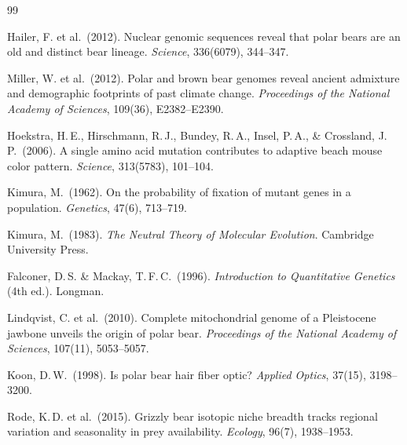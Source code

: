 ﻿\documentclass[12pt,a4paper]{article}
\theoremstyle{remark}
\begin{document}
\begin{thebibliography}{99}

Hailer, F. et al.\ (2012).
Nuclear genomic sequences reveal that polar bears are an old and distinct bear lineage.
\textit{Science}, 336(6079), 344--347.

Miller, W. et al.\ (2012).
Polar and brown bear genomes reveal ancient admixture and demographic footprints of past climate change.
\textit{Proceedings of the National Academy of Sciences}, 109(36), E2382--E2390.

Hoekstra, H.\,E., Hirschmann, R.\,J., Bundey, R.\,A., Insel, P.\,A., \& Crossland, J.\,P.\ (2006).
A single amino acid mutation contributes to adaptive beach mouse color pattern.
\textit{Science}, 313(5783), 101--104.

Kimura, M.\ (1962).
On the probability of fixation of mutant genes in a population.
\textit{Genetics}, 47(6), 713--719.

Kimura, M.\ (1983).
\textit{The Neutral Theory of Molecular Evolution}.
Cambridge University Press.

Falconer, D.\,S. \& Mackay, T.\,F.\,C.\ (1996).
\textit{Introduction to Quantitative Genetics} (4th ed.).
Longman.

Lindqvist, C. et al.\ (2010).
Complete mitochondrial genome of a Pleistocene jawbone unveils the origin of polar bear.
\textit{Proceedings of the National Academy of Sciences}, 107(11), 5053--5057.

Koon, D.\,W.\ (1998).
Is polar bear hair fiber optic?
\textit{Applied Optics}, 37(15), 3198--3200.

Rode, K.\,D. et al.\ (2015).
Grizzly bear isotopic niche breadth tracks regional variation and seasonality in prey availability.
\textit{Ecology}, 96(7), 1938--1953.

\end{thebibliography}
\end{document}
